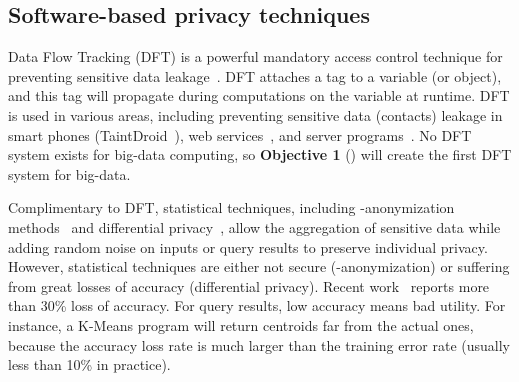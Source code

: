 \vspace{-.15in}\subsection{Software-based privacy techniques}
\label{sec:dft}\vspace{-.075in}

Data Flow Tracking (DFT) is a powerful mandatory access control technique for 
preventing sensitive data leakage~\cite{taintdroid:osdi10}. DFT attaches 
a tag to a variable (or object), and this tag will propagate during 
computations on the variable at runtime. DFT is used in various areas, 
including preventing sensitive data (\eg contacts) leakage in smart phones 
(TaintDroid~\cite{taintdroid:osdi10}), web services~\cite{cloudfence:raid13}, 
and server programs~\cite{libdft:vee12}. No DFT system exists for big-data 
computing, so \textbf{Objective 1} () will create the 
first DFT system for big-data.
 
 


Complimentary to DFT, statistical techniques, including -anonymization 
methods~\cite{kanonymity,icde06:ldiversity} and
differential privacy~\cite{gupt:sigmod12,pinq:sigmod09,airavat:nsdi10}, allow 
the aggregation of sensitive data while adding random noise on inputs or 
query results to preserve individual privacy. However, statistical techniques 
are either not secure (-anonymization) or suffering from great losses 
of accuracy (differential privacy). Recent 
work~\cite{differentialresult:vldb15} reports more than 30\% loss of accuracy. 
For query results, low accuracy means bad utility. For instance, a 
K-Means program will return centroids far from the actual ones, because 
the accuracy loss rate is much larger than the training error rate (usually 
less than 10\% in practice).

